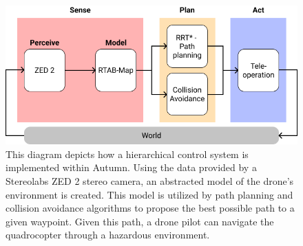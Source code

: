 \begin{figure}
	\centering
	\includegraphics[width=0.9\linewidth]{img/AutumnControlCycle}
	\caption{
		This diagram depicts how a hierarchical control system is implemented within Autumn. Using the data provided by a Stereolabs ZED 2 stereo camera, an abstracted model of the drone's environment is created. This model is utilized by path planning and collision avoidance algorithms to propose the best possible path to a given waypoint. Given this path, a drone pilot can navigate the quadrocopter through a hazardous environment. 
	}
	\label{fig:autumnControlLoop}
\end{figure}


\filbreak